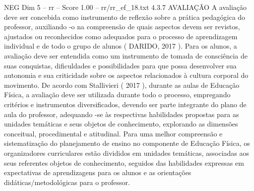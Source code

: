 \begin{textsample}{NEG Dim 5 – rr – Score 1.00 – rr/rr\_ef\_18.txt}  \label{ex:f5_neg_069}
4.3.7 AVALIAÇÃO A avaliação deve ser concebida como instrumento de reflexão sobre a prática pedagógica do professor, auxiliando -o na compreensão de quais aspectos devem ser revistos, ajustados ou reconhecidos como adequados para o processo de aprendizagem individual e de todo o grupo de alunos ( DARIDO, 2017 ).
Para os alunos, a avaliação deve ser entendida como um instrumento de tomada de consciência de suas conquistas, dificuldades e possibilidades para que possa desenvolver sua autonomia e sua criticidade sobre os aspectos relacionados à cultura corporal do movimento.
De acordo com Stallivieri ( 2017 ), durante as aulas de Educação Física, a avaliação deve ser utilizada durante todo o processo, empregando critérios e instrumentos diversificados, devendo ser parte integrante do plano de aula do professor, adequando -se às respectivas habilidades propostas para as unidades temáticas e seus objetos de conhecimento, explorando as dimensões conceitual, procedimental e atitudinal.
Para uma melhor compreensão e sistematização do planejamento de ensino no componente de Educação Física, os organizadores curriculares estão divididos em unidades temáticas, associadas aos seus referentes objetos de conhecimento, seguidos das habilidades expressas em expectativas de aprendizagens para os alunos e as orientações didáticas/metodológicas para o professor.

\end{textsample}
